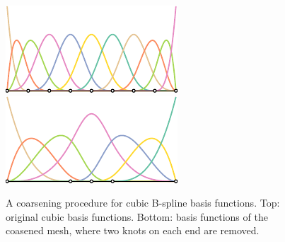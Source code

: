 \begin{figure}[ht]
  \centering
  \includegraphics[width=.4\linewidth]{basis_original}\\
  \includegraphics[width=.4\linewidth]{basis_coarse}
  \caption{A coarsening procedure for cubic B-spline basis functions. Top: original cubic basis functions. Bottom: basis functions of the coasened mesh, where two knots on each end are removed.}\label{fig:boundary_modification}
\end{figure}

